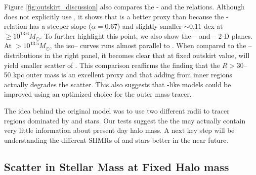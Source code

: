 \documentclass[fleqn,usenatbib,useAMS]{mnras}
\begin{document}
\begin{CJK*}{UTF8}{gbsn}
    Figure \ref{fig:outskirt_discussion} also compares the \masap{}- and the
     relations. 
    Although \asap{} does not explicitly use , it shows that  is a
    better \mvir{} proxy than  because the \masap{}- relation has a
    steeper slope ($\alpha=0.67$) and slightly smaller \sigms$\sim 0.11$ dex at 
    \masap$\geq 10^{13.6} M_{\odot}$. 
    To further highlight this point, we also show the -- and
    -- 2-D planes.
    At \masap{}$>10^{13.5} M_{\odot}$, the iso--\masap{} curves runs almost parallel to
    .
    When compared to the -- distributions in the right panel, it becomes 
    clear that at fixed outskirt \mstar{} value,  will yield smaller scatter of 
    \masap{}.
    This comparison reaffirms the finding that the $R > 30$--50 kpc outer mass is an excellent
    \mvir{} proxy and that adding \mstar{} from inner regions actually degrades the scatter.
    This also suggests that \asap{}-like models could be improved using an optimized choice for the
    outer mass tracer.

    The idea behind the original \asap{} model was to use two different radii to tracer regions 
    dominated by \insitu{} and \exsitu{} stars. Our \topn{} tests suggest the the \insitu{} may
    actually contain very little information about present day halo mass. 
    A next key step will be understanding the different SHMRs of \insitu{} and \exsitu{} stars
    better in the near future.

\subsection{Scatter in Stellar Mass at Fixed Halo mass}
    \label{sec:sigma_mstar}
    

\end{CJK*}
\end{document}
